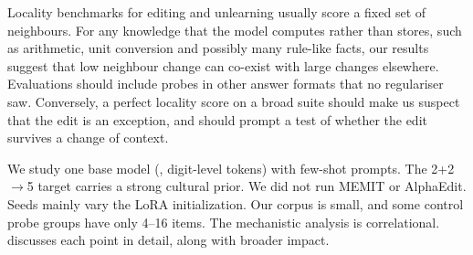  Locality benchmarks for editing and unlearning usually score a fixed set of neighbours. For any knowledge that the model computes rather than stores, such as arithmetic, unit conversion and possibly many rule-like facts, our results suggest that low neighbour change can co-exist with large changes elsewhere. Evaluations should include probes in other answer formats that no regulariser saw. Conversely, a perfect locality score on a broad suite should make us suspect that the edit is an exception, and should prompt a test of whether the edit survives a change of context.

 We study one base model (\qwen, digit-level tokens) with few-shot prompts. The 2+2$\to$5 target carries a strong cultural prior. We did not run MEMIT or AlphaEdit. Seeds mainly vary the LoRA initialization. Our \sdf corpus is small, and some control probe groups have only 4--16 items. The mechanistic analysis is correlational.  discusses each point in detail, along with broader impact.
